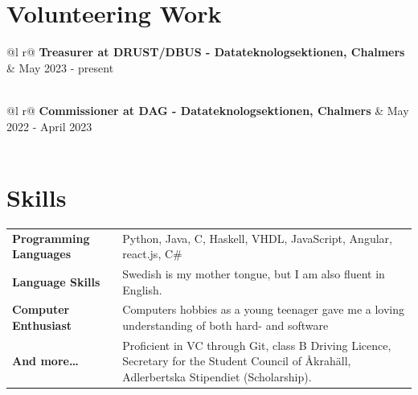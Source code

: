 \documentclass[a4paper,12pt]{article}
\begin{document}
\section{Volunteering Work}

\begin{tabularx}{\linewidth}{ @{}l r@{} }
    \textbf{Treasurer at \textbf{DRUST/DBUS - Datateknologsektionen, Chalmers}} & \hfill May 2023 - present \\[3.75pt]
      \\
    \end{tabularx}

\begin{tabularx}{\linewidth}{ @{}l r@{} }
\textbf{Commissioner at \textbf{DAG - Datateknologsektionen, Chalmers}} & \hfill May 2022 - April 2023  \\[3.75pt]
  \\
\end{tabularx}




\section{Skills}

\begin{tabularx}{\linewidth}{@{}l X@{}}
\textbf{Programming Languages} &  \normalsize{Python, Java, C, Haskell, VHDL, JavaScript, Angular, react.js, C\#}\\
\textbf{Language Skills}  &  \normalsize{Swedish is my mother tongue, but I am also fluent in English.}\\
\textbf{Computer Enthusiast}  &  \normalsize{Computers hobbies as a young teenager gave me a loving understanding of both hard- and software} \\
\textbf{And more\dots}  &  \normalsize{Proficient in VC through Git, class B Driving Licence, Secretary for the Student Council of Åkrahäll, Adlerbertska Stipendiet (Scholarship).}
\end{tabularx}

\vfill
\end{document}
